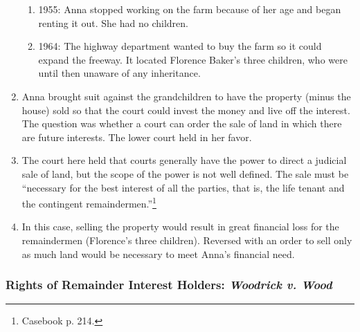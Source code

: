 \begin{enumerate}
\begin{enumerate}
        \item 1955: Anna stopped working on the farm because of her age and 
        began renting it out. She had no children.
        \item 1964: The highway department wanted to buy the farm so it could 
        expand the freeway. It located Florence Baker's three children, who 
        were until then unaware of any inheritance.
    \end{enumerate}
    \item Anna brought suit against the grandchildren to have the property 
    (minus the house) sold so that the court could invest the money and live 
    off the interest. The question was whether a court can order the sale of 
    land in which there are future interests. The lower court held in her 
    favor.
    \item The court here held that courts generally have the power to direct a 
    judicial sale of land, but the scope of the power is not well defined. The 
    sale must be ``necessary for the best interest of all the parties, that 
    is, the life tenant and the contingent remaindermen.''\footnote{Casebook 
    p. 214.}
    \item In this case, selling the property would result in great financial 
    loss for the remaindermen (Florence's three children). Reversed with an 
    order to sell only as much land would be necessary to meet Anna's 
    financial need.
\end{enumerate}

\subsubsection{Rights of Remainder Interest Holders: \emph{Woodrick v. Wood}}


